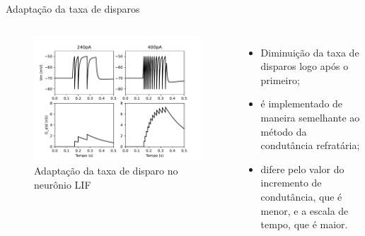 \begin{frame}{Adaptação da taxa de disparos}
	\begin{columns}[t]
		\column{5cm}
			\begin{figure}
				\centering
				\caption{Adaptação da taxa de disparo no neurônio LIF}
				\label{fig:lifatd}
				\includegraphics[width=\linewidth]{figs/lif_atd}
			\end{figure}
		\column{5cm}
		\begin{itemize}
			\item Diminuição da taxa de disparos logo após o primeiro; 
			\item é implementado de maneira semelhante ao método da condutância refratária;
			\item difere pelo valor do incremento de condutância, que é menor, e a escala de tempo, que é maior.
		\end{itemize}
	\end{columns}
\end{frame}

